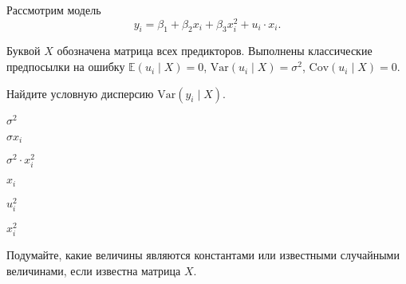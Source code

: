 
\begin{question}
Рассмотрим модель
\[
y_i = \beta_1 + \beta_2 x_i + \beta_3 x_i^2 + u_i\cdot x_i.
\]

Буквой \(X\) обозначена матрица всех предикторов.
Выполнены классические предпосылки на ошибку \(\mathbb E(u_i \mid X) = 0\), \(\mathrm{Var}(u_i \mid X) = \sigma^2\), \(\mathrm{Cov}(u_i \mid X) = 0\).

Найдите условную дисперсию \(\mathrm{Var}(y_i \mid X)\).
\begin{answerlist}
  \item \(\sigma^2\)
  \item \(\sigma x_i\)
  \item \(\sigma^2 \cdot x_i^2\)
  \item \(x_i\)
  \item \(u_i^2\)
  \item \(x_i^2\)
\end{answerlist}
\end{question}

\begin{solution}
Подумайте, какие величины являются константами или известными случайными величинами, если известна матрица \(X\).
\end{solution}

